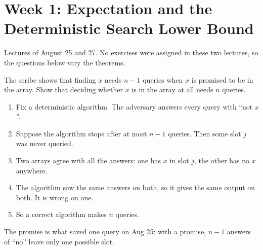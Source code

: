 \section{Week 1: Expectation and the Deterministic Search Lower Bound}\label{sec:week1}

Lectures of August 25 and 27. No exercises were assigned in these two lectures, so the questions
below vary the theorems.

\begin{opentable}
\end{opentable}

\begin{exercisebox}
\begin{pproblem}\label{pp:membership}
    The scribe shows that finding $x$ needs $n - 1$ queries when $x$ is promised to be in the array.
    Show that deciding whether $x$ is in the array at all needs $n$ queries.
\end{pproblem}
\tcblower
\begin{wsolution}
    \leavevmode
    \begin{enumerate}
        \item Fix a deterministic algorithm. The adversary answers every query with ``not $x$''.
        \item Suppose the algorithm stops after at most $n - 1$ queries. Then some slot $j$ was never
              queried.
        \item Two arrays agree with all the answers: one has $x$ in slot $j$, the other has no $x$
              anywhere.
        \item The algorithm saw the same answers on both, so it gives the same output on both. It is
              wrong on one.
        \item So a correct algorithm makes $n$ queries.
    \end{enumerate}
    The promise is what saved one query on Aug 25: with a promise, $n - 1$ answers of ``no'' leave
    only one possible slot.
\end{wsolution}
\end{exercisebox}


